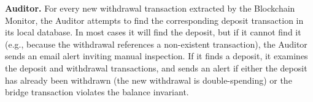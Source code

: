 
\textbf{Auditor.}
%
For every new withdrawal transaction extracted by the Blockchain
Monitor, the Auditor attempts to find the corresponding deposit
transaction in its local database.  In most cases it will find the
deposit, but if it cannot find it (e.g., because the
withdrawal references a non-existent transaction), the Auditor sends
an email alert inviting manual inspection. If it finds a deposit, it
examines the deposit and withdrawal transactions, and sends an
alert if either the deposit has already been withdrawn (the new
withdrawal is double-spending) or the bridge transaction violates
the balance invariant.







